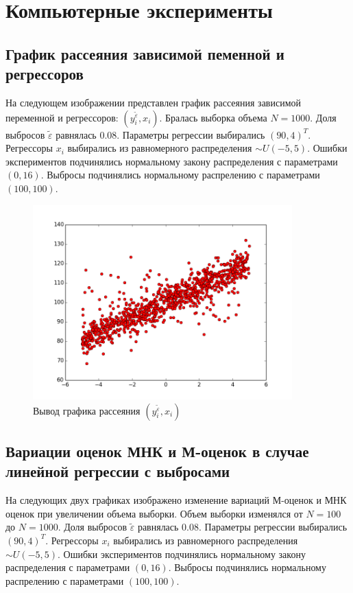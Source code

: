 \section{Компьютерные эксперименты}\label{sec_exp}
\subsection{График рассеяния зависимой пеменной и регрессоров}
На следующем изображении представлен график рассеяния зависимой переменной и регрессоров: $(y_i^{\widetilde{\varepsilon}}, x_i)$.
Бралась выборка объема $N = 1000$. Доля выбросов $\widetilde{\varepsilon}$ равнялась $0.08$. 
Параметры регрессии выбирались $(90, 4)^T$. 
Регрессоры $x_i$ выбирались из равномерного распределения $\sim U(-5,5)$. 
Ошибки экспериментов подчинялись нормальному закону распределения с параметрами $(0, 16)$. Выбросы подчинялись нормальному распрелению с параметрами $(100, 100)$. 

\begin{figure}[h!]
    \centering
    \includegraphics[width=100mm]{../images/scatter.png}
    \caption{Вывод графика рассеяния $(y_i^{\widetilde{\varepsilon}}, x_i)$\label{overflow}}
\end{figure}
\newpage


\subsection{Вариации оценок МНК и М-оценок в случае линейной регрессии с выбросами}\label{ss_1}
На следующих двух графиках изображено изменение вариаций М-оценок и МНК оценок при увеличении объема выборки.
Объем выборки изменялся от $N=100$ до $N=1000$. 
Доля выбросов $\widetilde{\varepsilon}$ равнялась $0.08$. 
Параметры регрессии выбирались $(90, 4)^T$. 
Регрессоры $x_i$ выбирались из равномерного распределения $\sim U(-5,5)$. 
Ошибки экспериментов подчинялись нормальному закону распределения с параметрами $(0, 16)$. Выбросы подчинялись нормальному распрелению с параметрами $(100, 100)$. 

